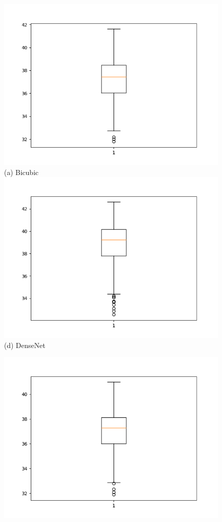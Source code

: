\documentclass[conference]{IEEEtran}
\begin{document}
\begin{figure}[h!]
  \centering
  \begin{minipage}{0.3\textwidth}
    \centering
    \includegraphics[width=\textwidth,height=0.2\textheight]{bicubic_rgb.png}
    (a) Bicubic
    \includegraphics[width=\textwidth,height=0.2\textheight]{dense_rgb (1).png}
    (d) DenseNet
  \end{minipage}%
  \begin{minipage}{0.3\textwidth}
  \centering
  \includegraphics[width=\textwidth,height=0.2\textheight]{srgan_rgb.png}

\end{minipage}
\end{figure}
\end{document}
